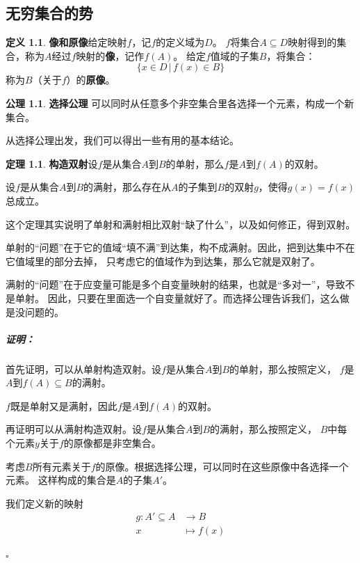 \documentclass[12pt,UTF8]{ctexbook}
\theoremstyle{definition}
\newtheorem{df}{定义}[section]
\newtheorem*{po}{公理}
\newtheorem{tm}{定理}[section]
\theoremstyle{plain}
\renewenvironment{proof}{\paragraph{\textbf{证明：}}}{\hfill$\square$}
\begin{document}
\begin{appendix}

\chapter{无穷集合的势}

\begin{df}{\textbf{像和原像}}\label{df:a-1-0}
    给定映射$f$，记$f$的定义域为$D$。
    $f$将集合$A\subseteq D$映射得到的集合，称为$A$经过$f$映射的\textbf{像}，记作$f(A)$。
    给定$f$值域的子集$B$，将集合：
    $$ \{x \in D \, | \, f(x) \in B \}$$
    称为$B$（关于$f$）的\textbf{原像}。
\end{df}

\begin{po}{\textbf{选择公理}}
    可以同时从任意多个非空集合里各选择一个元素，构成一个新集合。
\end{po}

从选择公理出发，我们可以得出一些有用的基本结论。

\begin{tm}{\textbf{构造双射}}\label{tm:a-1-0}
    设$f$是从集合$A$到$B$的单射，那么$f$是$A$到$f(A)$的双射。

    设$f$是从集合$A$到$B$的满射，那么存在从$A$的子集到$B$的双射$g$，使得$g(x) = f(x)$总成立。
\end{tm}

这个定理其实说明了单射和满射相比双射“缺了什么”，以及如何修正，得到双射。

单射的“问题”在于它的值域“填不满”到达集，构不成满射。因此，把到达集中不在它值域里的部分去掉，
只考虑它的值域作为到达集，那么它就是双射了。

满射的“问题”在于应变量可能是多个自变量映射的结果，也就是“多对一”，导致不是单射。
因此，只要在里面选一个自变量就好了。而选择公理告诉我们，这么做是没问题的。

\begin{proof}
    首先证明，可以从单射构造双射。设$f$是从集合$A$到$B$的单射，那么按照定义，
    $f$是$A$到$f(A)\subseteq B$的满射。

    $f$既是单射又是满射，因此$f$是$A$到$f(A)$的双射。

    再证明可以从满射构造双射。设$f$是从集合$A$到$B$的满射，那么按照定义，
    $B$中每个元素$y$关于$f$的原像都是非空集合。

    考虑$B$所有元素关于$f$的原像。根据选择公理，可以同时在这些原像中各选择一个元素。
    这样构成的集合是$A$的子集$A'$。

    我们定义新的映射
    \begin{align*}
        g: A'\subseteq A &\rightarrow B \\
        x &\mapsto f(x)
    \end{align*}
    

\end{proof}
\end{appendix}
\end{document}
